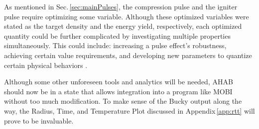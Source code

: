 As mentioned in Sec.\,\ref{sec:mainPulses}, the compression pulse and the igniter pulse require optimizing some variable.  Although these optimized variables were stated as the target density and the energy yield, respectively, each optimized quantity could be further complicated by investigating multiple properties simultaneously.  This could include: increasing a pulse effect's robustness, achieving certain value requirements, and developing new parameters to quantize certain physical behaviors \citep{terryThesis,perkinsPaper,picketPaper}.  

Although some other unforeseen tools and analytics will be needed, AHAB should now be in a state that allows integration into a program like MOBI without too much modification.  To make sense of the Bucky output along the way, the Radius, Time, and Temperature Plot discussed in Appendix\,\ref{app:rtt} will prove to be invaluable.